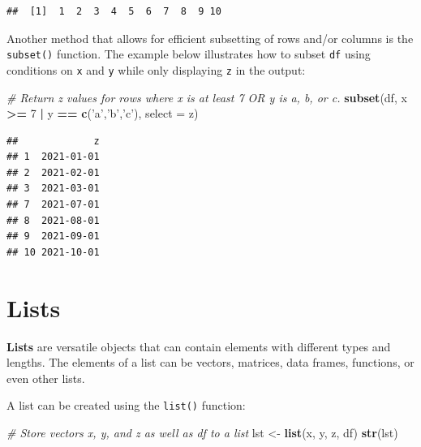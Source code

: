 \documentclass[]{book}
\newenvironment{Shaded}{\begin{snugshade}}{\end{snugshade}}
\newcommand{\CommentTok}[1]{\textcolor[rgb]{0.56,0.35,0.01}{\textit{#1}}}
\newcommand{\DataTypeTok}[1]{\textcolor[rgb]{0.13,0.29,0.53}{#1}}
\newcommand{\DecValTok}[1]{\textcolor[rgb]{0.00,0.00,0.81}{#1}}
\newcommand{\KeywordTok}[1]{\textcolor[rgb]{0.13,0.29,0.53}{\textbf{#1}}}
\newcommand{\NormalTok}[1]{#1}
\newcommand{\OperatorTok}[1]{\textcolor[rgb]{0.81,0.36,0.00}{\textbf{#1}}}
\newcommand{\StringTok}[1]{\textcolor[rgb]{0.31,0.60,0.02}{#1}}
\begin{document}
\begin{Shaded}
\end{Shaded}

\begin{verbatim}
##  [1]  1  2  3  4  5  6  7  8  9 10
\end{verbatim}

Another method that allows for efficient subsetting of rows and/or columns is the \texttt{subset()} function. The example below illustrates how to subset \texttt{df} using conditions on \texttt{x} and \texttt{y} while only displaying \texttt{z} in the output:

\begin{Shaded}
\begin{Highlighting}[]
\CommentTok{# Return z values for rows where x is at least 7 OR y is a, b, or c.}
\KeywordTok{subset}\NormalTok{(df, x }\OperatorTok{>=}\StringTok{ }\DecValTok{7} \OperatorTok{|}\StringTok{ }\NormalTok{y }\OperatorTok{==}\StringTok{ }\KeywordTok{c}\NormalTok{(}\StringTok{'a'}\NormalTok{,}\StringTok{'b'}\NormalTok{,}\StringTok{'c'}\NormalTok{), }\DataTypeTok{select =}\NormalTok{ z)}
\end{Highlighting}
\end{Shaded}

\begin{verbatim}
##             z
## 1  2021-01-01
## 2  2021-02-01
## 3  2021-03-01
## 7  2021-07-01
## 8  2021-08-01
## 9  2021-09-01
## 10 2021-10-01
\end{verbatim}

\hypertarget{lists}{%
\section{Lists}\label{lists}}

\textbf{Lists} are versatile objects that can contain elements with different types and lengths. The elements of a list can be vectors, matrices, data frames, functions, or even other lists.

A list can be created using the \texttt{list()} function:

\begin{Shaded}
\begin{Highlighting}[]
\CommentTok{# Store vectors x, y, and z as well as df to a list}
\NormalTok{lst <-}\StringTok{ }\KeywordTok{list}\NormalTok{(x, y, z, df)}
\KeywordTok{str}\NormalTok{(lst)}
\end{Highlighting}
\end{Shaded}
\end{document}
